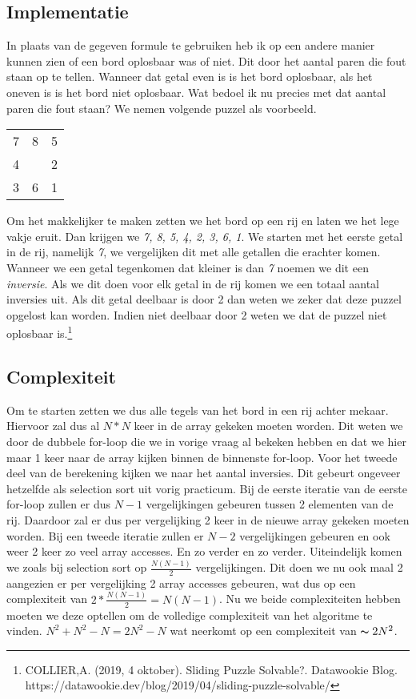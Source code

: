 \documentclass[12pt, letterpaper]{article}
\begin{document}
\subsection{Implementatie}
In plaats van de gegeven formule te gebruiken heb ik op een andere manier kunnen zien
of een bord oplosbaar was of niet. Dit door het aantal paren die fout staan op te tellen.
Wanneer dat getal even is is het bord oplosbaar, als het oneven is is het bord niet oplosbaar.
Wat bedoel ik nu precies met dat aantal paren die fout staan? We nemen volgende puzzel als voorbeeld.\newline
\begin{tabular}{c c c}
    7 & 8 & 5\\
    4 &  & 2\\
    3 & 6 & 1
\end{tabular}

Om het  makkelijker te maken zetten we het bord op een rij en laten we het lege vakje eruit. Dan krijgen we 
\textit{7, 8, 5, 4, 2, 3, 6, 1}. We starten met het eerste getal in de rij, namelijk \textit{7}, we vergelijken
dit met alle getallen die erachter komen. Wanneer we een getal tegenkomen dat kleiner is dan \textit{7} noemen
we dit een \textit{inversie}. Als we dit doen voor elk getal in de rij komen we een totaal aantal inversies uit.
Als dit getal deelbaar is door 2 dan weten we zeker dat deze puzzel opgelost kan worden. Indien niet deelbaar
door 2 weten we dat de puzzel niet oplosbaar is.\footnote{COLLIER,A. (2019, 4 oktober). Sliding Puzzle Solvable?. Datawookie Blog. https://datawookie.dev/blog/2019/04/sliding-puzzle-solvable/}

\subsection{Complexiteit}
Om te starten zetten we dus alle tegels van het bord in een rij achter mekaar. Hiervoor zal dus al $N * N$ keer
in de array gekeken moeten worden. Dit weten we door de dubbele for-loop die we in vorige vraag al bekeken hebben
en dat we hier maar 1 keer naar de array kijken binnen de binnenste for-loop. \newline
Voor het tweede deel van de berekening kijken we naar het aantal inversies. Dit gebeurt ongeveer hetzelfde als
selection sort uit vorig practicum. Bij de eerste iteratie van de eerste for-loop zullen er dus $N - 1$ vergelijkingen
gebeuren tussen 2 elementen van de rij. Daardoor zal er dus per vergelijking 2 keer in de nieuwe array gekeken moeten worden.
Bij een tweede iteratie zullen er $N - 2$ vergelijkingen gebeuren en ook weer 2 keer zo veel array accesses. En zo verder en zo verder.
Uiteindelijk komen we zoals bij selection sort op $\frac{N(N - 1)}{2}$ vergelijkingen. Dit doen we nu ook maal 2 aangezien er per vergelijking
2 array accesses gebeuren, wat dus op een complexiteit van $2 * \frac{N(N - 1)}{2} = N(N - 1)$. \newline
Nu we beide complexiteiten hebben moeten we deze optellen om de volledige complexiteit van het algoritme te vinden.
$N^2 + N^2 - N = 2N^2 - N$ wat neerkomt op een complexiteit van $\thicksim 2N^2$.
\end{document}
